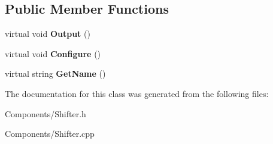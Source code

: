 \subsection*{\-Public \-Member \-Functions}
\begin{DoxyCompactItemize}
\item 
\hypertarget{class_shifter_a125a695c747e2ecc8dca5bc7d92263df}{
virtual void {\bfseries \-Output} ()}
\label{class_shifter_a125a695c747e2ecc8dca5bc7d92263df}

\item 
\hypertarget{class_shifter_a2035edb76bc861b3cf9fa6a8b763d7a9}{
virtual void {\bfseries \-Configure} ()}
\label{class_shifter_a2035edb76bc861b3cf9fa6a8b763d7a9}

\item 
\hypertarget{class_shifter_af5abaaa762bbf51f3bc3f669f0078b62}{
virtual string {\bfseries \-Get\-Name} ()}
\label{class_shifter_af5abaaa762bbf51f3bc3f669f0078b62}

\end{DoxyCompactItemize}


\-The documentation for this class was generated from the following files\-:\begin{DoxyCompactItemize}
\item 
\-Components/\-Shifter.\-h\item 
\-Components/\-Shifter.\-cpp\end{DoxyCompactItemize}
